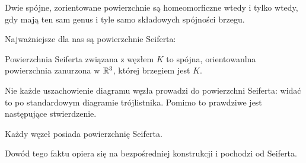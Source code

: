 \begin{proposition}
    Dwie spójne, zorientowane powierzchnie są homeomorficzne wtedy i tylko 
    wtedy, gdy mają ten sam genus i tyle samo składowych spójności brzegu.
\end{proposition}

Najważniejsze dla nas są powierzchnie Seiferta:

\begin{definition} 
    Powierzchnia Seiferta związana z węzłem $K$ to spójna, 
    orientowanlna powierzchnia zanurzona w $\mathbb R^3$, której brzegiem jest $K$.
\end{definition}


Nie każde uszachowienie diagramu węzła prowadzi do powierzchni Seiferta: 
widać to po standardowym diagramie trójlistnika.
Pomimo to prawdziwe jest następujące stwierdzenie.

\begin{proposition}
    Każdy węzeł posiada powierzchnię Seiferta.
\end{proposition}

Dowód tego faktu opiera się na bezpośredniej konstrukcji i pochodzi od Seiferta.

